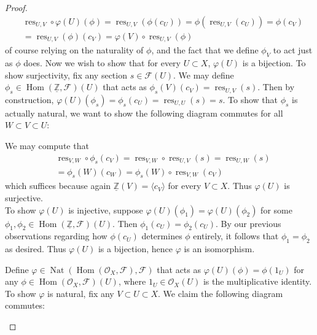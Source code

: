 \documentclass{article}
\newcommand{\Z}{\mathbb{Z}}
\newcommand{\fO}{\mathscr{O}}
\newcommand{\fF}{\mathscr{F}}
\DeclareMathOperator{\res}{res}
\DeclareMathOperator{\Hom}{Hom}
\DeclareMathOperator{\Nat}{Nat}
\begin{document}
\begin{proof}
    \begin{align*}
        &\res_{U,V}\circ \varphi(U)(\phi)=\res_{U,V}(\phi(c_U))=\phi(\res_{U,V}(c_U))=\phi(c_V)\\
        &=\res_{U,V}(\phi)(c_V)=\varphi(V)\circ \res_{U,V}(\phi)
    \end{align*}
    of course relying on the naturality of $\phi$, and the fact that we define $\phi_{V}$ to act just as $\phi$ does. Now we wish to show that for every $U\subset X$, $\varphi(U)$ is a bijection. To show surjectivity, fix any section $s\in \fF(U)$. We may define $\phi_s\in \Hom(\underline{\Z},\fF)(U)$ that acts as $\phi_s(V)(c_V)=\res_{U,V}(s)$. Then by construction, $\varphi(U)(\phi_s)=\phi_s(c_U)=\res_{U,U}(s)=s$. To show that $\phi_s$ is actually natural, we want to show the following diagram commutes for all $W\subset V\subset U$:
    \begin{center}
    \end{center}
    We may compute that
    \begin{align*}
        &\res_{V,W}\circ \phi_s(c_V)=\res_{V,W}\circ \res_{U,V}(s)=\res_{U,W}(s)\\
        &=\phi_s(W)(c_W)=\phi_s(W)\circ \res_{V,W}(c_V)
    \end{align*}
    which suffices because again $\underline{\Z}(V)=\langle c_V\rangle$ for every $V\subset X$. Thus $\varphi(U)$ is surjective.\\
    To show $\varphi(U)$ is injective, suppose $\varphi(U)(\phi_1)=\varphi(U)(\phi_2)$ for some $\phi_1,\phi_2\in \Hom(\underline{\Z},\fF)(U)$. Then $\phi_1(c_U)=\phi_2(c_U)$. By our previous observations regarding how $\phi(c_U)$ determines $\phi$ entirely, it follows that $\phi_1=\phi_2$ as desired. Thus $\varphi(U)$ is a bijection, hence $\varphi$ is an isomorphism.
    \item Define $\varphi\in \Nat(\Hom(\fO_X,\fF),\fF)$ that acts as $\varphi(U)(\phi)=\phi(1_U)$ for any $\phi \in \Hom(\fO_X,\fF)(U)$, where $1_U\in \fO_X(U)$ is the multiplicative identity. To show $\varphi$ is natural, fix any $V\subset U\subset X$. We claim the following diagram commutes:
    \begin{center}
        \begin{tikzcd}

\end{tikzcd}
\end{center}
\end{proof}
\end{document}
